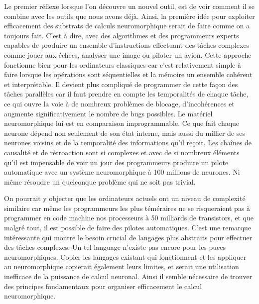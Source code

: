 	Le premier réflexe lorsque l'on découvre un nouvel outil, est de voir comment il se combine avec les outils que nous avons déjà. Ainsi, la première idée pour exploiter efficacement des substrats de calculs neuromorphique serait de faire comme on a toujours fait. C'est à dire, avec des algorithmes et des programmeurs experts capables de produire un ensemble d'instructions effectuant des tâches complexes comme jouer aux échecs, analyser une image ou piloter un avion. Cette approche fonctionne bien pour les ordinateurs classiques car c'est relativement simple à faire lorsque les opérations sont séquentielles et la mémoire un ensemble cohérent et interprétable. Il devient plus compliqué de programmer de cette façon des tâches parallèles car il faut prendre en compte les temporalités de chaque tâche, ce qui ouvre la voie à de nombreux problèmes de blocage, d'incohérences et augmente significativement le nombre de bugs possibles. Le matériel neuromorphique lui est en comparaison improgrammable. Ce que fait chaque neurone dépend non seulement de son état interne, mais aussi du millier de ses neurones voisins et de la temporalité des informations qu'il reçoit. Les chaînes de causalité et de rétroaction sont si complexes et avec de si nombreux éléments qu'il est impensable de voir un jour des programmeurs produire un pilote automatique avec un système neuromorphique à 100 millions de neurones. Ni même résoudre un quelconque problème qui ne soit pas trivial.

	On pourrait y objecter que les ordinateurs actuels ont un niveau de complexité similaire car même les programmeurs les plus téméraires ne se risqueraient pas à programmer en code machine nos processeurs à 50 milliards de transistors, et que malgré tout, il est possible de faire des pilotes automatiques. C'est une remarque intéressante qui montre le besoin crucial de langages plus abstraits pour effectuer des tâches complexes. Un tel language n'existe pas encore pour les puces neuromorphiques. Copier les langages existant qui fonctionnent et les appliquer au neuromorphique copierait également leurs limites, et serait une utilisation inefficace de la puissance de calcul neuronal. Ainsi il semble nécessaire de trouver des principes fondamentaux pour organiser efficacement le calcul neuromorphique.

